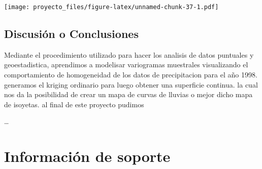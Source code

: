 \documentclass[11pt,]{article}
\newenvironment{Shaded}{\begin{snugshade}}{\end{snugshade}}
\newcommand{\KeywordTok}[1]{\textcolor[rgb]{0.13,0.29,0.53}{\textbf{#1}}}
\newcommand{\DataTypeTok}[1]{\textcolor[rgb]{0.13,0.29,0.53}{#1}}
\newcommand{\DecValTok}[1]{\textcolor[rgb]{0.00,0.00,0.81}{#1}}
\newcommand{\StringTok}[1]{\textcolor[rgb]{0.31,0.60,0.02}{#1}}
\newcommand{\OperatorTok}[1]{\textcolor[rgb]{0.81,0.36,0.00}{\textbf{#1}}}
\newcommand{\NormalTok}[1]{#1}
\begin{document}
\begin{Shaded}
\end{Shaded}

\texttt{[image: proyecto\_files/figure-latex/unnamed-chunk-37-1.pdf]}

\subsection{Discusión o
Conclusiones}\label{discusiuxf3n-o-conclusiones-1}

Mediante el procedimiento utilizado para hacer los analisis de datos
puntuales y geoestadistica, aprendimos a modelisar variogramas
muestrales visualizando el comportamiento de homogeneidad de los datos
de precipitacion para el año 1998. generamos el kriging ordinario para
luego obtener una superficie continua. la cual nos da la posibilidad de
crear un mapa de curvas de lluvias o mejor dicho mapa de isoyetas. al
final de este proyecto pudimos

\ldots

\section{Información de soporte}\label{informaciuxf3n-de-soporte-1}
\end{document}
